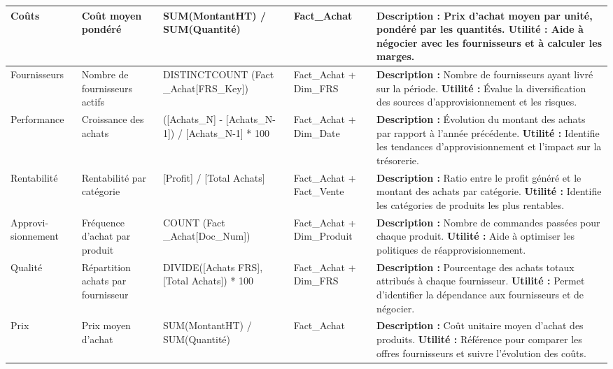 {\begin{longtable}{|p{2cm}|p{1.8cm}|p{2.8cm}|p{2.2cm}|p{6cm}|}
Coûts & Coût moyen pondéré & SUM(MontantHT) / SUM(Quantité) & Fact\_Achat & \textbf{Description :} Prix d'achat moyen par unité, pondéré par les quantités. \newline \textbf{Utilité :} Aide à négocier avec les fournisseurs et à calculer les marges. \\
\hline

Fournisseurs & Nombre de fournisseurs actifs & DISTINCTCOUNT (Fact \_Achat[FRS\_Key]) & Fact\_Achat + Dim\_FRS & \textbf{Description :} Nombre de fournisseurs ayant livré sur la période. \newline \textbf{Utilité :} Évalue la diversification des sources d'approvisionnement et les risques. \\
\hline

Performance & Croissance des achats & ([Achats\_N] - [Achats\_N-1]) / [Achats\_N-1] * 100 & Fact\_Achat + Dim\_Date & \textbf{Description :} Évolution du montant des achats par rapport à l'année précédente. \newline \textbf{Utilité :} Identifie les tendances d'approvisionnement et l'impact sur la trésorerie. \\
\hline

Rentabilité & Rentabilité par catégorie & [Profit] / [Total Achats] & Fact\_Achat + Fact\_Vente & \textbf{Description :} Ratio entre le profit généré et le montant des achats par catégorie. \newline \textbf{Utilité :} Identifie les catégories de produits les plus rentables. \\
\hline

Approvi- sionnement & Fréquence d'achat par produit & COUNT (Fact \_Achat[Doc\_Num]) & Fact\_Achat + Dim\_Produit & \textbf{Description :} Nombre de commandes passées pour chaque produit. \newline \textbf{Utilité :} Aide à optimiser les politiques de réapprovisionnement. \\
\hline

Qualité & Répartition achats par fournisseur & DIVIDE([Achats FRS], [Total Achats]) * 100 & Fact\_Achat + Dim\_FRS & \textbf{Description :} Pourcentage des achats totaux attribués à chaque fournisseur. \newline \textbf{Utilité :} Permet d'identifier la dépendance aux fournisseurs et de négocier. \\
\hline

Prix & Prix moyen d'achat & SUM(MontantHT) / SUM(Quantité) & Fact\_Achat & \textbf{Description :} Coût unitaire moyen d'achat des produits. \newline \textbf{Utilité :} Référence pour comparer les offres fournisseurs et suivre l'évolution des coûts. \\
\hline


\end{longtable}}
